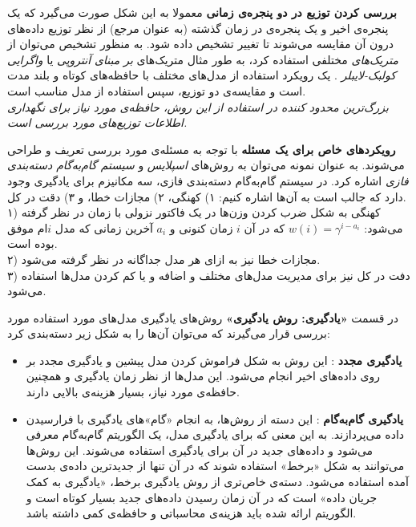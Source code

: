 
\textbf{
بررسی کردن توزیع در دو پنجره‌ی زمانی
} 
معمولا به این شکل صورت می‌گیرد که یک پنجره‌ی اخیر و یک پنجره‌ی در زمان گذشته (به عنوان مرجع) از نظر توزیع داده‌های درون آن مقایسه می‌شوند تا تغییر تشخیص داده شود. به منظور تشخیص می‌توان از 
\textit{
متریک‌های
} 
مختلفی استفاده کرد، به طور مثال متریک‌های 
\textit{
بر مبنای آنتروپی
} 
یا 
\textit{
واگرایی کولبک-لایبلر
}. 
یک رویکرد استفاده از مدل‌های مختلف با حافظه‌های کوتاه و بلند مدت است و مقایسه‌ی دو توزیع، سپس استفاده از مدل مناسب است.\\
\textit{
بزرگ‌ترین محدود کننده در استفاده از این روش، حافظه‌ی مورد نیاز برای نگهداری اطلاعات توزیع‌های مورد بررسی است.
}


\textbf{
رویکردهای خاص برای یک مسئله
} 
با توجه به مسئله‌ی مورد بررسی تعریف و طراحی می‌شوند. به عنوان نمونه می‌توان به روش‌های 
\textit{
اسپلایس
} 
و 
\textit{
سیستم گام‌به‌گام دسته‌بندی فازی
} 
اشاره کرد. در سیستم گام‌به‌گام دسته‌بندی فازی، سه مکانیزم برای یادگیری وجود دارد که جالب است به آن‌ها اشاره کنیم: ۱) کهنگی، ۲) مجازات خطا، و ۳) دقت در کل.\\
۱) کهنگی به شکل ضرب کردن وزن‌ها در یک فاکتور نزولی با زمان در نظر گرفته می‌شود: 
$w(i) = \gamma^{i - a_i} $ 
که در آن 
$i$ 
زمان کنونی و 
$a_i$ 
آخرین زمانی که مدل 
$i$ام 
موفق بوده است.\\
۲) مجازات خطا نیز به ازای هر مدل جداگانه در نظر گرفته می‌شود.\\
۳) دفت در کل نیز برای مدیریت مدل‌های مختلف و اضافه و یا کم کردن مدل‌ها استفاده می‌شود.

\vspace{5mm}
در قسمت 
\textbf{
«یادگیری: روش یادگیری»
} 
روش‌های یادگیری مدل‌های مورد استفاده مورد بررسی قرار می‌گیرند که می‌توان آن‌ها را به شکل زیر دسته‌بندی کرد:
\begin{itemize}
\item \textbf{
یادگیری مجدد
}: 
این روش به شکل فراموش کردن مدل پیشین و یادگیری مجدد بر روی داده‌های اخیر انجام می‌شود. این مدل‌ها از نظر زمان یادگیری و همچنین حافظه‌ی مورد نیاز، بسیار هزینه‌ی بالایی دارند.

\item \textbf{
یادگیری گام‌به‌گام
}: 
این دسته از روش‌ها، به انجام «گام»‌های یادگیری با فرارسیدن داده می‌پردازند. به این معنی که برای یادگیری مدل، یک الگوریتم گام‌به‌گام معرفی می‌شود و داده‌های جدید در آن برای یادگیری استفاده می‌شوند. این روش‌ها می‌توانند به شکل «برخط» استفاده شوند که در آن تنها از جدیدترین داده‌ی بدست آمده استفاده می‌شود. دسته‌ی خاص‌تری از روش یادگیری برخط، «یادگیری به کمک جریان داده» است که در آن زمان رسیدن داده‌های جدید بسیار کوتاه است و الگوریتم ارائه شده باید هزینه‌ی محاسباتی و حافظه‌ی کمی داشته باشد.

\end{itemize}

